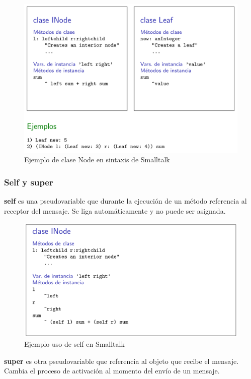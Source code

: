 \documentclass{report}
\theoremstyle{definition} %
\begin{document}
\begin{figure}[H]
    \centering
    \includegraphics[scale=0.25]{img/poo/st-node.png}
    \caption{Ejemplo de clase Node en sintaxis de Smalltalk}
\end{figure}

\subsubsection{Self y super}

\textbf{self} es una pseudovariable que durante la ejecución de un
método referencia al receptor del mensaje. Se liga automáticamente y no puede
ser asignada.

\begin{figure}[H]
    \centering
    \includegraphics[scale=0.25]{img/poo/st-self.png}
    \caption{Ejemplo uso de self en Smalltalk}
\end{figure}

\textbf{super} es otra pseudovariable que referencia al objeto que recibe el
mensaje. Cambia el proceso de activación al momento del envío de un mensaje.
\end{document}
